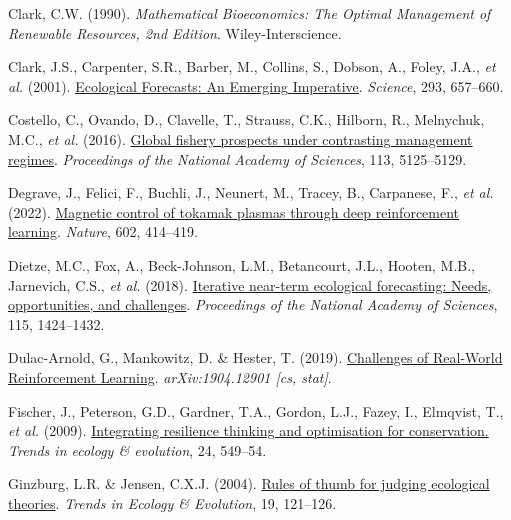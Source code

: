 \documentclass[3p]{elsarticle} %
\newlength{\cslhangindent}
\newenvironment{CSLReferences}[2] %
 {%
  \setlength{\parindent}{0pt}
  \ifodd #1 \everypar{\setlength{\hangindent}{\cslhangindent}}\ignorespaces\fi
  \ifnum #2 > 0
  \setlength{\parskip}{#2\baselineskip}
  \fi
 }%
 {}
\begin{document}
\begin{CSLReferences}{1}{0}
\leavevmode{}%
Clark, C.W. (1990). \emph{{Mathematical Bioeconomics: The Optimal
Management of Renewable Resources, 2nd Edition}}. Wiley-Interscience.

\leavevmode{}%
Clark, J.S., Carpenter, S.R., Barber, M., Collins, S., Dobson, A.,
Foley, J.A., \emph{et al.} (2001).
\href{https://doi.org/10.1126/science.293.5530.657}{Ecological
{Forecasts}: {An} {Emerging} {Imperative}}. \emph{Science}, 293,
657--660.

\leavevmode{}%
Costello, C., Ovando, D., Clavelle, T., Strauss, C.K., Hilborn, R.,
Melnychuk, M.C., \emph{et al.} (2016).
\href{https://doi.org/10.1073/pnas.1520420113}{{Global fishery prospects
under contrasting management regimes}}. \emph{Proceedings of the
National Academy of Sciences}, 113, 5125--5129.

\leavevmode{}%
Degrave, J., Felici, F., Buchli, J., Neunert, M., Tracey, B., Carpanese,
F., \emph{et al.} (2022).
\href{https://doi.org/10.1038/s41586-021-04301-9}{Magnetic control of
tokamak plasmas through deep reinforcement learning}. \emph{Nature},
602, 414--419.

\leavevmode{}%
Dietze, M.C., Fox, A., Beck-Johnson, L.M., Betancourt, J.L., Hooten,
M.B., Jarnevich, C.S., \emph{et al.} (2018).
\href{https://doi.org/10.1073/pnas.1710231115}{Iterative near-term
ecological forecasting: {Needs}, opportunities, and challenges}.
\emph{Proceedings of the National Academy of Sciences}, 115, 1424--1432.

\leavevmode{}%
Dulac-Arnold, G., Mankowitz, D. \& Hester, T. (2019).
\href{http://arxiv.org/abs/1904.12901}{Challenges of {Real}-{World}
{Reinforcement} {Learning}}. \emph{arXiv:1904.12901 {[}cs, stat{]}}.

\leavevmode{}%
Fischer, J., Peterson, G.D., Gardner, T.A., Gordon, L.J., Fazey, I.,
Elmqvist, T., \emph{et al.} (2009).
\href{https://doi.org/10.1016/j.tree.2009.03.020}{Integrating resilience
thinking and optimisation for conservation.} \emph{Trends in ecology \&
evolution}, 24, 549--54.

\leavevmode{}%
Ginzburg, L.R. \& Jensen, C.X.J. (2004).
\href{https://doi.org/10.1016/j.tree.2003.11.004}{Rules of thumb for
judging ecological theories}. \emph{Trends in Ecology \& Evolution}, 19,
121--126.


\end{CSLReferences}
\end{document}
